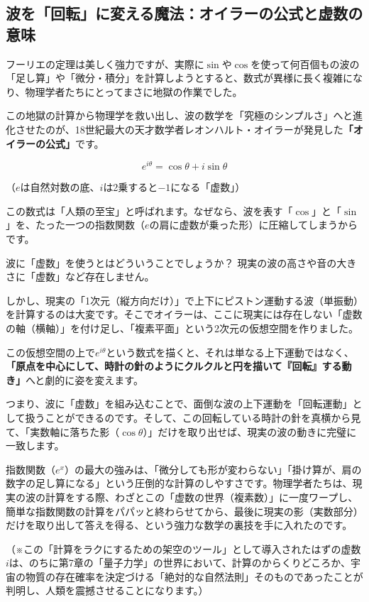 \subsection{波を「回転」に変える魔法：オイラーの公式と虚数の意味}

フーリエの定理は美しく強力ですが、実際に\(\sin\)や\(\cos\)を使って何百個もの波の「足し算」や「微分・積分」を計算しようとすると、数式が異様に長く複雑になり、物理学者たちにとってまさに地獄の作業でした。

この地獄の計算から物理学を救い出し、波の数学を「究極のシンプルさ」へと進化させたのが、18世紀最大の天才数学者レオンハルト・オイラーが発見した\textbf{「オイラーの公式」}です。

\[e^{i\theta} = \cos\theta + i\sin\theta\]

（\(e\)は自然対数の底、\(i\)は2乗すると\(-1\)になる「虚数」）

この数式は「人類の至宝」と呼ばれます。なぜなら、波を表す「\(\cos\)」と「\(\sin\)」を、たった一つの指数関数（\(e\)の肩に虚数が乗った形）に圧縮してしまうからです。

波に「虚数」を使うとはどういうことでしょうか？ 現実の波の高さや音の大きさに「虚数」など存在しません。

しかし、現実の「1次元（縦方向だけ）」で上下にピストン運動する波（単振動）を計算するのは大変です。そこでオイラーは、ここに現実には存在しない「虚数の軸（横軸）」を付け足し、「複素平面」という2次元の仮想空間を作りました。

この仮想空間の上で\(e^{i\theta}\)という数式を描くと、それは単なる上下運動ではなく、\textbf{「原点を中心にして、時計の針のようにクルクルと円を描いて『回転』する動き」}へと劇的に姿を変えます。

つまり、波に「虚数」を組み込むことで、面倒な波の上下運動を「回転運動」として扱うことができるのです。そして、この回転している時計の針を真横から見て、「実数軸に落ちた影（\(\cos\theta\)）」だけを取り出せば、現実の波の動きに完璧に一致します。

指数関数（\(e^{x}\)）の最大の強みは、「微分しても形が変わらない」「掛け算が、肩の数字の足し算になる」という圧倒的な計算のしやすさです。物理学者たちは、現実の波の計算をする際、わざとこの「虚数の世界（複素数）」に一度ワープし、簡単な指数関数の計算をパパッと終わらせてから、最後に現実の影（実数部分）だけを取り出して答えを得る、という強力な数学の裏技を手に入れたのです。

（※この「計算をラクにするための架空のツール」として導入されたはずの虚数\(i\)は、のちに第7章の「量子力学」の世界において、計算のからくりどころか、宇宙の物質の存在確率を決定づける「絶対的な自然法則」そのものであったことが判明し、人類を震撼させることになります。）

